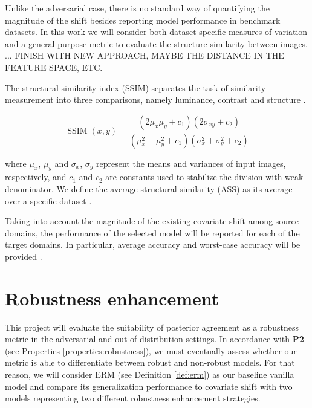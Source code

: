 Unlike the adversarial case, there is no standard way of quantifying
the magnitude of the shift besides reporting model performance in benchmark
datasets. In this work we will consider both
dataset-specific measures of variation and a general-purpose metric
to evaluate the structure similarity between images. 
... FINISH WITH NEW APPROACH,
MAYBE THE DISTANCE IN THE FEATURE SPACE, ETC.

\begin{definition}[ASS]
    The structural similarity index (SSIM) separates the task 
    of similarity measurement into three comparisons, namely 
    luminance, contrast and structure 
    \cite{wangImageQualityAssessment2004}. 
    
    $$
    \operatorname{SSIM}(x, y)=\frac{\left(2 \mu_x \mu_y+c_1\right)\left(2 \sigma_{x y}+c_2\right)}{\left(\mu_x^2+\mu_y^2+c_1\right)\left(\sigma_x^2+\sigma_y^2+c_2\right)}
    $$

    where $\mu_x$, $\mu_y$ and $\sigma_x$, $\sigma_y$ represent the 
    means and variances of input images, respectively, and 
    $c_1$ and $c_2$ are constants used to stabilize the 
    division with weak denominator. We define the average 
    structural similarity (ASS) as its average over a specific dataset
    \cite{guoComprehensiveEvaluationFramework2023}.
\end{definition}

Taking into account the magnitude of the existing covariate shift among source
domains, the performance of the selected model will be reported for each of
the target domains. In particular, average accuracy and worst-case accuracy
will be provided
\cite{zhouDomainGeneralizationSurvey2022}.

\section{Robustness enhancement}

This project will evaluate the suitability of posterior agreement as a robustness
metric in the adversarial and out-of-distribution settings. In accordance with
\textbf{P2} (see Properties \ref{properties:robustness}), we must eventually
assess whether our metric is able to differentiate between robust and non-robust
models. For that reason, we will consider ERM (see Definition \ref{def:erm}) as
our baseline vanilla model and compare its generalization performance to covariate
shift with two models representing two different robustness enhancement strategies. \\

